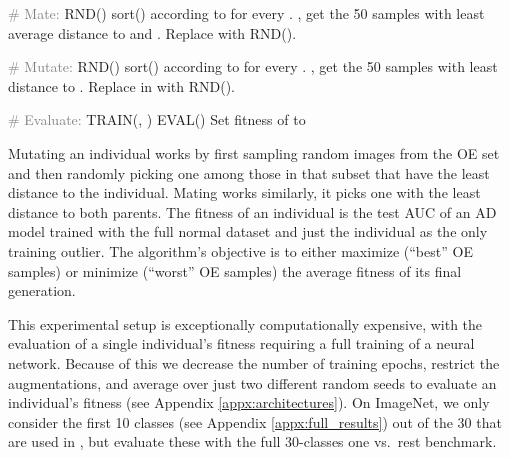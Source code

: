 \documentclass[10pt]{article} \usepackage[accepted]{stylefiles/tmlr}
\newcommand{\algcom}[1]{\textcolor{gray}{\# {#1}}}
\begin{document}
\begin{algorithm}[H]
\begin{algorithmic}
            \STATE \algcom{Mate:}
            \FORALL{}
                    \STATE 
                    \STATE  
                    \FORALL{}
                        \STATE  RND()
                        \STATE sort() according to  for every .
                        \STATE , get the 50 samples with least average distance to  and .
                        \STATE Replace  with RND().
                    \ENDFOR
                \ENDIF
            \ENDFOR
            \vspace{0.5em}
            
            \STATE \algcom{Mutate:}
            \FORALL{}
                    \STATE  RND()
                    \STATE sort() according to  for every .
                    \STATE , get the 50 samples with least distance to .
                    \STATE Replace  in  with RND().
                \ENDIF
            \ENDFOR
            \vspace{0.5em}
    
            \STATE \algcom{Evaluate:}
            \FORALL{}
                \STATE TRAIN(, )
                \STATE  EVAL()
                \STATE Set fitness of  to 
            \ENDFOR
            \vspace{0.5em}
            
        \ENDFOR
    
    \end{algorithmic}
\end{algorithm}

Mutating an individual works by first sampling random images from the OE set and then randomly picking one among those  in that subset that have the least  distance to the individual. 
Mating works similarly, it picks one with the least  distance to both parents.  
The fitness of an individual is the test AUC of an AD model trained with the full normal dataset and just the individual as the only training outlier. 
The algorithm's objective is to either maximize (``best'' OE samples) or minimize (``worst'' OE samples) the average fitness of its final generation.



This experimental setup is exceptionally computationally expensive, with the evaluation of a single individual's fitness requiring a full training of a neural network. 
Because of this we decrease the number of training epochs, restrict the augmentations, and average over just two different random seeds to evaluate an individual's fitness (see Appendix \ref{appx:architectures}).
On ImageNet, we only consider the first 10 classes (see Appendix \ref{appx:full_results}) out of the 30 that are used in \citet{hendrycks2019deep}, but evaluate these with the full 30-classes one vs.~rest benchmark.
\end{document}
